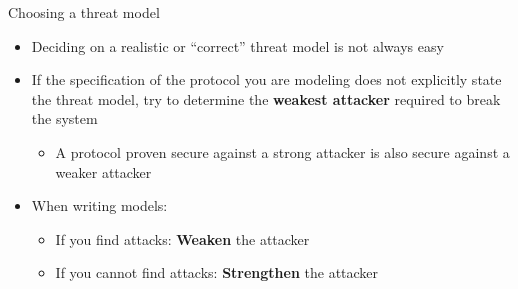 \documentclass[11pt,aspectratio=169]{beamer}
\begin{document}
\begin{frame}[fragile]{Choosing a threat model}
    \begin{itemize}
        \item Deciding on a realistic or ``correct'' threat model is not always 
              easy
        \item If the specification of the protocol you are modeling does not 
              explicitly state the threat model, try to determine the
              \textbf{weakest attacker} required to break the system
        \begin{itemize}
            \item A protocol proven secure against a strong attacker is also 
                  secure against a weaker attacker
        \end{itemize}
        \item When writing models:
        \begin{itemize}
            \item If you find attacks: \textbf{Weaken} the attacker
            \item If you cannot find attacks: \textbf{Strengthen} the attacker
        \end{itemize}
    \end{itemize}
\end{frame}
\end{document}
